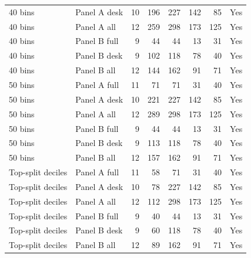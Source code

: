 \begin{tabular}{llrrrrrc}
40 bins & Panel A desk & 10 & 196 & 227 & 142 & 85 & Yes \\
40 bins & Panel A all & 12 & 259 & 298 & 173 & 125 & Yes \\
40 bins & Panel B full & 9 & 44 & 44 & 13 & 31 & Yes \\
40 bins & Panel B desk & 9 & 102 & 118 & 78 & 40 & Yes \\
40 bins & Panel B all & 12 & 144 & 162 & 91 & 71 & Yes \\
50 bins & Panel A full & 11 & 71 & 71 & 31 & 40 & Yes \\
50 bins & Panel A desk & 10 & 221 & 227 & 142 & 85 & Yes \\
50 bins & Panel A all & 12 & 289 & 298 & 173 & 125 & Yes \\
50 bins & Panel B full & 9 & 44 & 44 & 13 & 31 & Yes \\
50 bins & Panel B desk & 9 & 113 & 118 & 78 & 40 & Yes \\
50 bins & Panel B all & 12 & 157 & 162 & 91 & 71 & Yes \\
Top-split deciles & Panel A full & 11 & 58 & 71 & 31 & 40 & Yes \\
Top-split deciles & Panel A desk & 10 & 78 & 227 & 142 & 85 & Yes \\
Top-split deciles & Panel A all & 12 & 112 & 298 & 173 & 125 & Yes \\
Top-split deciles & Panel B full & 9 & 40 & 44 & 13 & 31 & Yes \\
Top-split deciles & Panel B desk & 9 & 60 & 118 & 78 & 40 & Yes \\
Top-split deciles & Panel B all & 12 & 89 & 162 & 91 & 71 & Yes \\
\bottomrule
\end{tabular}

